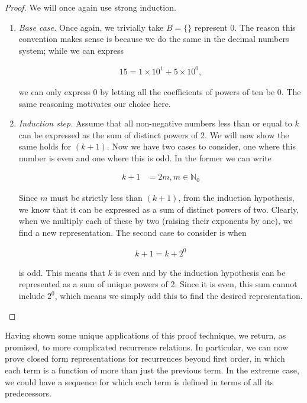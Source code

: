 \documentclass[twoside]{report}
\begin{document}
\begin{proof}
	We will once again use strong induction.
	
	\vspace{\baselineskip}
	\begin{enumerate}
		\item \emph{Base case.} Once again, we trivially take $B = \{ \}$ represent 0. The reason this convention makes sense is because we do the same in the decimal numbers system; while we can express 
		
		\begin{align*}
			15 = 1 \times 10^1 + 5 \times 10^0,
		\end{align*}
		
		we can only express 0 by letting all the coefficients of powers of ten be 0. The same reasoning motivates our choice here.
		
		\item \emph{Induction step.} Assume that all non-negative numbers less than or equal to $k$ can be expressed as the sum of distinct powers of 2. We will now show the same holds for $(k + 1)$. Now we have two cases to consider, one where this number is even and one where this is odd. In the former we can write
		
		\begin{align*}
			k + 1 &= 2m, m \in \mathbb{N}_0
		\end{align*}
		
		Since $m$ must be strictly less than $(k + 1)$, from the induction hypothesis, we know that it can be expressed as a sum of distinct powers of two. Clearly, when we multiply each of these by two (raising their exponents by one), we find a new representation. The second case to consider is when
		
		\begin{align*}
			k + 1 = k + 2^0
		\end{align*}
		
		is odd. This means that $k$ is even and by the induction hypothesis can be represented as a sum of unique powers of 2. Since it is even, this sum cannot include $2^0$, which means we simply add this to find the desired representation.
	\end{enumerate}
\end{proof}
\vspace{\baselineskip}

Having shown some unique applications of this proof technique, we return, as promised, to more complicated recurrence relations. In particular, we can now prove closed form representations for recurrences beyond first order, in which each term is a function of more than just the previous term. In the extreme case, we could have a sequence for which each term is defined in terms of all its predecessors.
\end{document}
